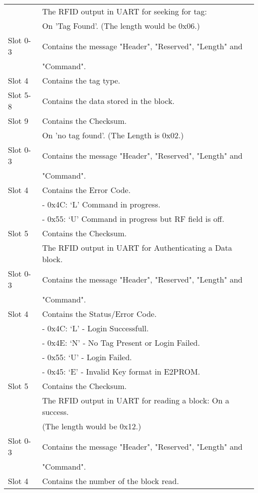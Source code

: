 \begin{tabular}{|l|l|}
\hline
\hline
& The RFID output in UART for seeking for tag:\\
&  On 'Tag Found'. (The length would be 0x06.)\\
\hline
Slot 0-3 & Contains the message "Header", "Reserved", "Length" and\\
& "Command".\\
Slot 4 & Contains the tag type. \\
Slot 5-8 & Contains the data stored in the block.\\
Slot 9 & Contains the Checksum.\\
\hline
&On 'no tag found'. (The Length is 0x02.)\\
\hline
Slot 0-3 & Contains the message "Header", "Reserved", "Length" and\\
& "Command".\\
Slot 4 & Contains the Error Code.\\
& \indent - 0x4C: `L' Command in progress.\\
& \indent - 0x55: `U' Command in progress but RF field is off.\\
Slot 5 & Contains the Checksum.\\
\hline
\hline
&The RFID output in UART for Authenticating a Data block.\\
\hline
Slot 0-3 & Contains the message "Header", "Reserved", "Length" and\\
& "Command".\\
Slot 4 & Contains the Status/Error Code.\\
& \indent - 0x4C: `L' - Login Successfull.\\
& \indent - 0x4E: `N' - No Tag Present or Login Failed.\\
& \indent - 0x55: `U' - Login Failed.\\
& \indent - 0x45: `E' - Invalid Key format in E2PROM.\\
Slot 5 & Contains the Checksum.\\
\hline
\hline 
& The RFID output in UART for reading a block: On a success.\\
& (The length would be 0x12.) \\
\hline
Slot 0-3 & Contains the message "Header", "Reserved", "Length" and\\
& "Command".\\
Slot 4 & Contains the number of the block read. \\

\end{tabular}
